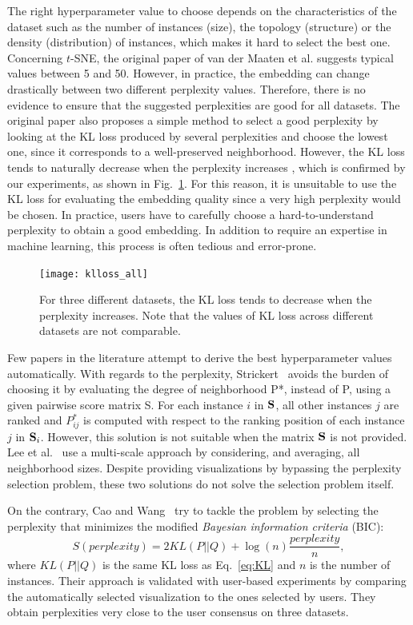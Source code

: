 The right hyperparameter value to choose depends on the characteristics of the dataset such as the number of instances (size), the topology (structure) or the density (distribution) of instances, which makes it hard to select the best one.
Concerning $t$-SNE, the original paper of van der Maaten et al. \cite{maaten2008tsne} suggests typical values between 5 and 50.
However, in practice, the embedding can change drastically between two different perplexity values. Therefore, there is no evidence to ensure that the suggested perplexities are good for all datasets.
The original paper also proposes a simple method to select a good perplexity by looking at the KL loss produced by several perplexities and choose the lowest one, since it corresponds to a well-preserved neighborhood.
However, the KL loss tends to naturally decrease when the perplexity increases \cite{cao2017automatic}, which  is confirmed by our experiments, as shown in Fig.~\ref{fig:klloss}. For this reason, it is unsuitable to use the KL loss for evaluating the embedding quality since a very high perplexity would be chosen.
In practice, users have to carefully choose a hard-to-understand perplexity to obtain a good embedding.
In addition to require an expertise in machine learning, this process is often tedious and error-prone.

\begin{figure}
    \centering
    \texttt{[image: klloss\_all]}
    \caption{For three different datasets, the KL loss tends to decrease when the perplexity increases. Note that the values of KL loss across different datasets are not comparable.}
    \label{fig:klloss}
\end{figure}

Few papers in the literature attempt to derive the best hyperparameter values automatically.
With regards to the perplexity, Strickert~\cite{strickert2012} avoids the burden of choosing it by evaluating the degree of neighborhood P*, instead of P, using a given pairwise score matrix S. For each instance $i$ in ${\bf S}$, all other instances $j$ are ranked and ${P}^*_{ij}$ is computed with respect to the ranking position of each instance $j$ in ${\bf S}_i$. However, this solution is not suitable when the matrix ${\bf S}$ is not provided.
Lee et al.~\cite{lee2014} use a multi-scale approach by considering, and averaging, all neighborhood sizes. Despite providing visualizations by bypassing the perplexity selection problem, these two solutions do not solve the selection problem itself.

On the contrary, Cao and Wang~\cite{cao2017automatic} try to tackle the problem by selecting the perplexity that minimizes the modified \emph{Bayesian information criteria} (BIC):
\begin{equation}
S(\textit{perplexity}) = 2KL(P||Q) + \log(n)\frac{\textit{perplexity}}{n},
\end{equation}
where $KL(P||Q)$ is the same KL loss as Eq.~\ref{eq:KL} and $n$ is the number of instances.
Their approach is validated with user-based experiments by comparing the automatically selected visualization to the ones selected by users. They obtain perplexities very close to the user consensus on three datasets.

